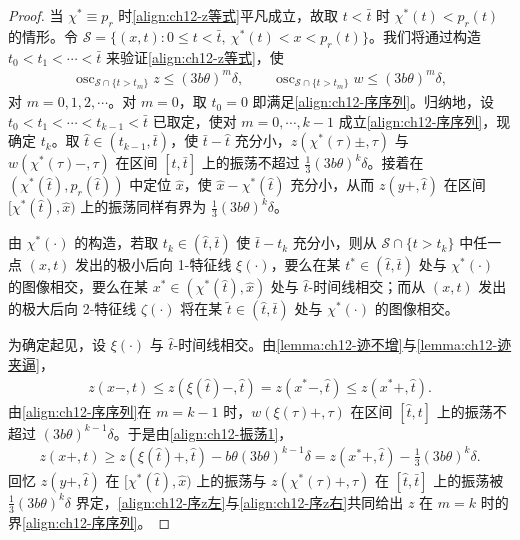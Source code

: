 \documentclass[../../main.tex]{subfiles}
\begin{document}
\begin{proof}
当 $\chi^*\equiv p_r$ 时\eqref{align:ch12-z等式}平凡成立，故取 $t<\bar t$ 时 $\chi^*(t)<p_r(t)$ 的情形。令 $\mathscr{S}=\{(x,t):0\leqslant t<\bar t,\ \chi^*(t)<x<p_r(t)\}$。我们将通过构造 $t_0<t_1<\cdots<\bar t$ 来验证\eqref{align:ch12-z等式}，使
\begin{align}
\operatorname{osc}_{\mathscr{S}\cap\{t>t_m\}}z\leqslant(3b\theta)^m\delta,\qquad
\operatorname{osc}_{\mathscr{S}\cap\{t>t_m\}}w\leqslant(3b\theta)^m\delta,
\label{align:ch12-序序列}
\end{align}
对 $m=0,1,2,\cdots$。对 $m=0$，取 $t_0=0$ 即满足\eqref{align:ch12-序序列}。归纳地，设 $t_0<t_1<\cdots<t_{k-1}<\bar t$ 已取定，使对 $m=0,\cdots,k-1$ 成立\eqref{align:ch12-序序列}，现确定 $t_k$。取 $\hat t\in(t_{k-1},\bar t)$，使 $\bar t-\hat t$ 充分小，$z(\chi^*(\tau)\pm,\tau)$ 与 $w(\chi^*(\tau)-,\tau)$ 在区间 $[\hat t,\bar t]$ 上的振荡不超过 $\frac13(3b\theta)^k\delta$。接着在 $(\chi^*(\hat t),p_r(\hat t))$ 中定位 $\hat x$，使 $\hat x-\chi^*(\hat t)$ 充分小，从而 $z(y+,\hat t)$ 在区间 $[\chi^*(\hat t),\hat x)$ 上的振荡同样有界为 $\frac13(3b\theta)^k\delta$。

由 $\chi^*(\cdot)$ 的构造，若取 $t_k\in(\hat t,\bar t)$ 使 $\bar t-t_k$ 充分小，则从 $\mathscr{S}\cap\{t>t_k\}$ 中任一点 $(x,t)$ 发出的极小后向 1-特征线 $\xi(\cdot)$，要么在某 $t^*\in(\hat t,\bar t)$ 处与 $\chi^*(\cdot)$ 的图像相交，要么在某 $x^*\in(\chi^*(\hat t),\hat x)$ 处与 $\hat t$-时间线相交；而从 $(x,t)$ 发出的极大后向 2-特征线 $\zeta(\cdot)$ 将在某 $\tilde t\in(\hat t,\bar t)$ 处与 $\chi^*(\cdot)$ 的图像相交。

为确定起见，设 $\xi(\cdot)$ 与 $\hat t$-时间线相交。由\cref{lemma:ch12-迹不增}与\cref{lemma:ch12-迹夹逼}，
\begin{align}
z(x-,t)\leqslant z(\xi(\hat t)-,\hat t)=z(x^*-,\hat t)\leqslant z(x^*+,\hat t).
\label{align:ch12-序z左}
\end{align}
由\eqref{align:ch12-序序列}在 $m=k-1$ 时，$w(\xi(\tau)+,\tau)$ 在区间 $[\hat t,t]$ 上的振荡不超过 $(3b\theta)^{k-1}\delta$。于是由\eqref{align:ch12-振荡1}，
\begin{align}
z(x+,t)\geqslant z(\xi(\hat t)+,\hat t)-b\theta(3b\theta)^{k-1}\delta=z(x^*+,\hat t)-\frac13(3b\theta)^k\delta.
\label{align:ch12-序z右}
\end{align}
回忆 $z(y+,\hat t)$ 在 $[\chi^*(\hat t),\hat x)$ 上的振荡与 $z(\chi^*(\tau)+,\tau)$ 在 $[\hat t,\bar t]$ 上的振荡被 $\frac13(3b\theta)^k\delta$ 界定，\eqref{align:ch12-序z左}与\eqref{align:ch12-序z右}共同给出 $z$ 在 $m=k$ 时的界\eqref{align:ch12-序序列}。


\end{proof}
\end{document}
